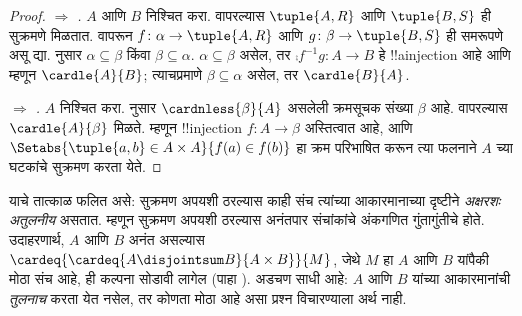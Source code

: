 \documentclass[../../../include/open-logic-section]{subfiles}
\begin{document}
\begin{proof}
\emph{ $\Rightarrow$ .} $A$ आणि $B$ निश्चित करा.  वापरल्यास $\tuple{A, R}$ आणि $\tuple{B, S}$ ही सुक्रमणे मिळतात.  वापरून $f \colon
\alpha \to \tuple{A, R}$ आणि $g \colon \beta \to \tuple{B, S}$ ही समरूपणे असू द्या.  नुसार $\alpha \subseteq \beta$ किंवा $\beta \subseteq \alpha$. $\alpha \subseteq \beta$ असेल, तर $\comp{f^{-1}}{g} \colon A \to B$ हे !!a{injection} आहे आणि म्हणून
$\cardle{A}{B}$; त्याचप्रमाणे $\beta \subseteq \alpha$ असेल, तर $\cardle{B}{A}$.

\emph{ $\Rightarrow$ .} $A$ निश्चित करा.  नुसार $\cardnless{\beta}{A}$ असलेली क्रमसूचक संख्या $\beta$ आहे.  वापरल्यास $\cardle{A}{\beta}$ मिळते. म्हणून !!{injection} $f \colon A \to
\beta$ अस्तित्वात आहे, आणि $\Setabs{\tuple{a, b} \in A \times A}{f(a)
\in f(b)}$ हा क्रम परिभाषित करून त्या फलनाने $A$ च्या घटकांचे सुक्रमण करता येते.
\end{proof}
\noindent
याचे तात्काळ फलित असे: सुक्रमण अपयशी ठरल्यास काही संच त्यांच्या आकारमानाच्या दृष्टीने \emph{अक्षरशः अतुलनीय} असतात. म्हणून सुक्रमण अपयशी ठरल्यास अनंतपार संचांकांचे अंकगणित गुंतागुंतीचे होते. उदाहरणार्थ, $A$ आणि $B$ अनंत असल्यास $\cardeq{\cardeq{A \disjointsum B}{A \times
B}}{M}$, जेथे $M$ हा $A$ आणि $B$ यांपैकी मोठा संच आहे, ही कल्पना सोडावी लागेल (पाहा ). अडचण साधी आहे: $A$ आणि $B$ यांच्या आकारमानांची \emph{तुलनाच} करता येत नसेल, तर कोणता मोठा आहे असा प्रश्न विचारण्याला अर्थ नाही.
\end{document}
